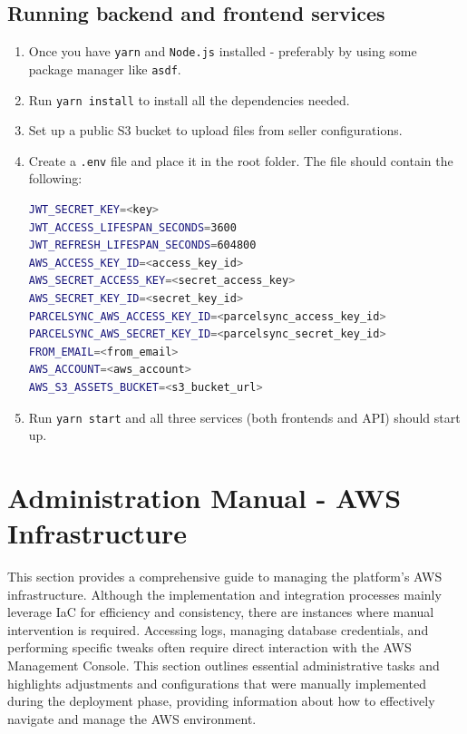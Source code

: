 \subsection{Running backend and frontend services}
\begin{enumerate}
    \item Once you have \texttt{yarn} and \texttt{Node.js} installed - preferably by using some package manager like \texttt{asdf}.
    \item Run \texttt{yarn install} to install all the dependencies needed.
    \item Set up a public S3 bucket to upload files from seller configurations. 
    \item Create a \texttt{.env} file and place it in the root folder. The file should contain the following:
\begin{lstlisting}[language=bash,caption={Platform local environment configuration}]
JWT_SECRET_KEY=<key>
JWT_ACCESS_LIFESPAN_SECONDS=3600
JWT_REFRESH_LIFESPAN_SECONDS=604800
AWS_ACCESS_KEY_ID=<access_key_id>
AWS_SECRET_ACCESS_KEY=<secret_access_key>
AWS_SECRET_KEY_ID=<secret_key_id>
PARCELSYNC_AWS_ACCESS_KEY_ID=<parcelsync_access_key_id>
PARCELSYNC_AWS_SECRET_KEY_ID=<parcelsync_secret_key_id>
FROM_EMAIL=<from_email>
AWS_ACCOUNT=<aws_account>
AWS_S3_ASSETS_BUCKET=<s3_bucket_url>
\end{lstlisting}
    \item Run \texttt{yarn start} and all three services (both frontends and API) should start up.
\end{enumerate}
    

\section{Administration Manual - AWS Infrastructure}
\label{attachments:admin-manual-aws-platform}
This section provides a comprehensive guide to managing the platform's AWS infrastructure. 
Although the implementation and integration processes mainly leverage \ac{IaC} for efficiency and consistency, there are instances where manual intervention is required. 
Accessing logs, managing database credentials, and performing specific tweaks often require direct interaction with the AWS Management Console. 
This section outlines essential administrative tasks and highlights adjustments and configurations that were manually implemented during the deployment phase, providing information about how to effectively navigate and manage the AWS environment.

